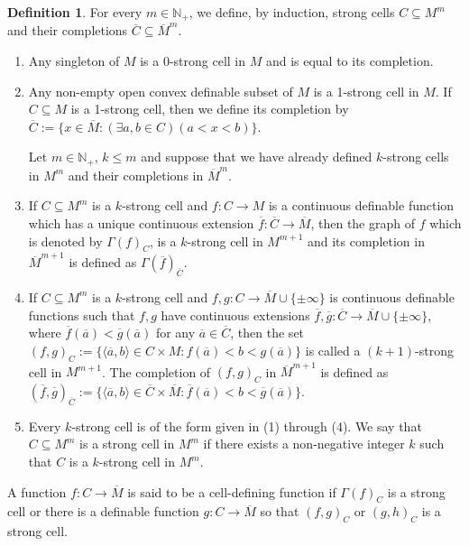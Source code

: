 \documentclass{amsart}
\theoremstyle{definition}
\newtheorem{definition}{Definition}[section]
\theoremstyle{plain}
\newcommand{\bN}{\mathbb N}
\newcommand{\ov}[1]{\overline{#1}}
\begin{document}
\begin{definition}
For every $m \in \bN_{+}$,
we define, by induction,  strong cells $C \subseteq M^m$ and their completions $\ov{C} \subseteq \ov{M}^m$.

\begin{enumerate}
\item
Any singleton of $M$ is a $0$-strong cell in $M$ and is equal to its completion.

\item
Any non-empty open convex definable subset of $M$ is a 1-strong cell in $M$.
If $C \subseteq M$ is a 1-strong cell,
then we define its completion by $\ov{C} := \{ x \in \ov{M}  : (\exists a, b \in C)(a < x < b)\}$.


Let $m \in \bN_{+}$, $k \leq m$ and suppose that we have already defined $k$-strong cells in $M^m$ and 
their completions in $\ov{M}^m$.

\item
If $C \subseteq M^m$ is a $k$-strong cell and $f : C \to M$ is a continuous definable function 
which has a unique continuous extension $\ov{f} : \ov{C} \to \ov{M}$,
then the graph of $f$ which is denoted by $\Gamma(f)_C$, is a $k$-strong cell in $M^{m+1}$ and 
its completion in $\ov{M}^{m+1}$ is defined as $\Gamma(\ov{f})_{\ov{C}}$.

\item
If $C \subseteq M^m$ is a $k$-strong cell and $f,g : C \to \ov{M} \cup \{ \pm \infty \}$ is continuous definable functions
such that $f, g$ have continuous extensions $\ov{f}, \ov{g} : \ov{C} \to \ov{M} \cup \{ \pm \infty \}$, where $\ov{f}(\ov{a}) < \ov{g}(\ov{a})$ for any $\ov{a} \in \ov{C}$,
then the set $(f, g)_C := \{ \langle \ov{a}, b \rangle \in C \times M : f(\ov{a}) <b < g(\ov{a}) \}$ is called a $(k+1)$-strong cell in $M^{m+1}$.
The completion of $(f, g)_C$ in $\ov{M}^{m+1}$ is defined as  $(\ov{f}, \ov{g})_{\ov{C}} := \{ \langle \ov{a}, b \rangle \in \ov{C} \times \ov{M} : \ov{f}(\ov{a}) <b < \ov{g}(\ov{a}) \}$.

\item 
Every $k$-strong cell is of the form given in (1) through (4).
We say that $C \subseteq M^m$ is a strong cell in $M^m$ 
if there exists a non-negative integer $k$ such that $C$ is a $k$-strong cell in $M^m$.
\end{enumerate}

\end{definition}


A function $f : C \to \ov{M}$ is said to be a cell-defining function if
$\Gamma(f)_C$ is a strong cell or there is a definable function $g : C \to \ov{M}$
so that $(f, g)_C$ or $(g, h)_C$ is a strong cell.
\end{document}
